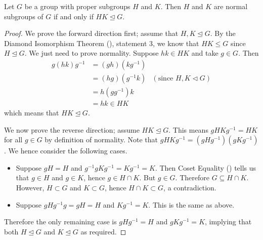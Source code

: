 \begin{corollary}\label{corollary-subgroup-product-is-normal-subgroup-iff-subgroups-are-normal}
    Let $G$ be a group with proper subgroups $H$ and $K$. Then $H$ and $K$ are normal subgroups of $G$ if and only if $HK \unlhd G$.
\end{corollary}
\begin{proof}
    We prove the forward direction first; assume that $H, K \unlhd G$. By the Diamond Isomorphism Theorem (), statement 3, we know that $HK \leq G$ since $H \unlhd G$. We just need to prove normality. Suppose $hk \in HK$ and take $g \in G$. Then
    \begin{align*}
        g(hk)g^{-1} &= (gh)(kg^{-1})\\
        &= (hg)(g^{-1}k) & (\text{since } H, K \lhd G)\\
        &= h(gg^{-1})k\\
        &= hk \in HK
    \end{align*}
    which means that $HK \unlhd G$.

    We now prove the reverse direction; assume $HK \unlhd G$. This means $gHKg^{-1} = HK$ for all $g \in G$ by definition of normality. Note that $gHKg^{-1} = (gHg^{-1})(gKg^{-1})$. We hence consider the following cases.
    \begin{itemize}
        \item Suppose $gH = H$ and $g^{-1}gKg^{-1} = Kg^{-1} = K$. Then Coset Equality () tells us that $g \in H$ and $g \in K$, hence $g \in H \cap K$. But $g \in G$. Therefore $G \subseteq H \cap K$. However, $H \subset G$ and $K \subset G$, hence $H \cap K \subset G$, a contradiction.
        \item Suppose $gHg^{-1}g = gH = H$ and $Kg^{-1} = K$. This is the same as above.
    \end{itemize}
    Therefore the only remaining case is $gHg^{-1} = H$ and $gKg^{-1} = K$, implying that both $H \unlhd G$ and $K \unlhd G$ as required.
\end{proof}

\newpage

